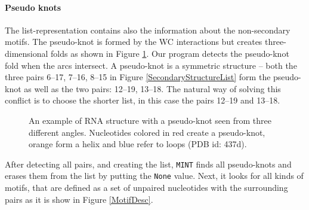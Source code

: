\documentclass[12pt]{article}
\begin{document}
\paragraph{Pseudo knots}
The list-representation contains also the information about the non-secondary motifs. The pseudo-knot is formed by the WC interactions but creates three-dimensional folds as shown in Figure \ref{PseudoKnot}. Our program detects the pseudo-knot fold when the arcs intersect. A pseudo-knot is a symmetric structure -- both the three pairs 6--17, 7--16, 8--15  in Figure \ref{SecondaryStructureList} form the pseudo-knot as well as the two pairs: 12--19, 13--18. The natural way of solving this conflict is to choose the shorter list, in this case the pairs 12--19 and 13--18.  
\begin{figure}[h!]
\begin{center}
\end{center}
\caption{An example of RNA structure with a pseudo-knot seen from three different angles. Nucleotides colored in red create a pseudo-knot, orange form a helix and blue refer to loops (PDB id: 437d).}
\label{PseudoKnot}
\end{figure}
\newpage
After detecting all pairs, and creating the list, {\tt MINT} finds all pseudo-knots and erases them from the list by putting the \texttt{None} value. Next, it looks for all kinds of motifs, that are defined as a set of unpaired nucleotides with the surrounding pairs as it is show in Figure \ref{MotifDesc}.
\end{document}
